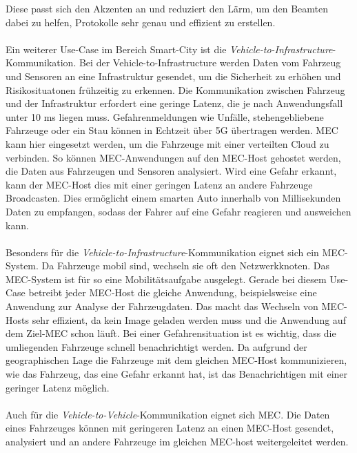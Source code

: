 \documentclass[runningheads]{llncs}
\numberwithin{figure}{section}
\begin{document}
Diese passt sich den Akzenten an und reduziert den Lärm, um den Beamten dabei zu helfen, 
Protokolle sehr genau und effizient zu erstellen. \cite{5GGivingLaw}
\\
\\
Ein weiterer Use-Case im Bereich Smart-City ist die \textit{Vehicle-to-Infrastructure}-Kommunikation.
Bei der Vehicle-to-Infrastructure werden Daten vom Fahrzeug und Sensoren an eine Infrastruktur gesendet, um die Sicherheit zu erhöhen und 
Risikosituatonen frühzeitig zu erkennen. 
Die Kommunikation zwischen Fahrzeug und der Infrastruktur erfordert eine geringe Latenz, 
die je nach Anwendungsfall unter 10 ms liegen muss. 
Gefahrenmeldungen wie Unfälle, stehengebliebene Fahrzeuge oder ein Stau können in Echtzeit über 5G übertragen werden.
MEC kann hier eingesetzt werden, um die Fahrzeuge mit einer verteilten Cloud zu verbinden. So können MEC-Anwendungen auf den MEC-Host 
gehostet werden, die Daten aus Fahrzeugen und Sensoren analysiert. Wird eine Gefahr erkannt, kann der MEC-Host dies mit einer
geringen Latenz an andere Fahrzeuge Broadcasten. 
Dies ermöglicht einem smarten Auto innerhalb von Millisekunden Daten zu empfangen, 
sodass der Fahrer auf eine Gefahr reagieren und ausweichen kann.
\\
\\
Besonders für die \textit{Vehicle-to-Infrastructure}-Kommunikation eignet sich ein MEC-System. Da Fahrzeuge mobil sind, wechseln sie
oft den Netzwerkknoten. Das MEC-System ist für so eine Mobilitätsaufgabe ausgelegt. Gerade bei diesem Use-Case betreibt 
jeder MEC-Host die gleiche Anwendung, beispielsweise eine Anwendung zur Analyse der Fahrzeugdaten. Das macht das Wechseln von MEC-Hosts sehr effizient,
da kein Image geladen werden muss und die Anwendung auf dem Ziel-MEC schon läuft. Bei einer Gefahrensituation ist es wichtig, dass die
umliegenden Fahrzeuge schnell benachrichtigt werden. Da aufgrund der geographischen Lage die Fahrzeuge mit dem gleichen MEC-Host
kommunizieren, wie das Fahrzeug, das eine Gefahr erkannt hat, ist das Benachrichtigen mit einer geringer Latenz möglich. 
\\
\\
Auch für die \textit{Vehicle-to-Vehicle}-Kommunikation eignet sich MEC. Die Daten eines Fahrzeuges können mit geringeren Latenz
an einen MEC-Host gesendet, analysiert und an andere Fahrzeuge im gleichen MEC-host weitergeleitet werden.
\end{document}
